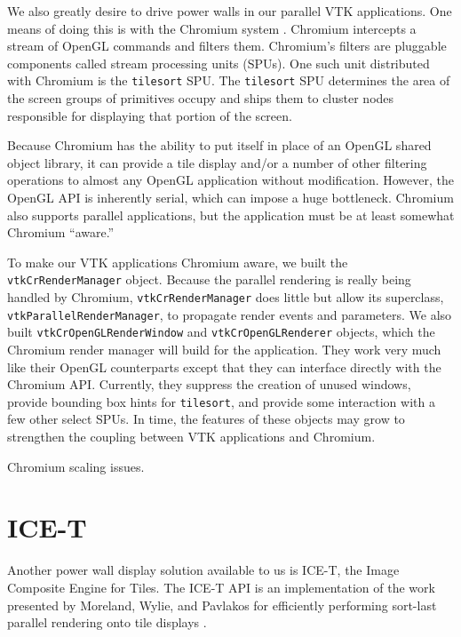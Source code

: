 \documentclass[twocolumn]{article}
\newcommand{\cidentifier}[1]{\texttt{#1}}
\begin{document}
  We also greatly desire to drive power walls in our parallel VTK
  applications.  One means of doing this is with the Chromium system
  \cite{Humphreys02}.  Chromium intercepts a stream of OpenGL commands and
  filters them.  Chromium's filters are pluggable components called stream
  processing units (SPUs).  One such unit distributed with Chromium is the
  \cidentifier{tile\-sort} SPU.  The \cidentifier{tile\-sort} SPU
  determines the area of the screen groups of primitives occupy and ships
  them to cluster nodes responsible for displaying that portion of the
  screen.

  Because Chromium has the ability to put itself in place of an OpenGL
  shared object library, it can provide a tile display and/or a number of
  other filtering operations to almost any OpenGL application without
  modification.  However, the OpenGL API is inherently serial, which can
  impose a huge bottleneck.  Chromium also supports parallel applications,
  but the application must be at least somewhat Chromium ``aware.''

  To make our VTK applications Chromium aware, we built the
  \cidentifier{vtk\-Cr\-Render\-Manager} object.  Because the parallel
  rendering is really being handled by Chromium,
  \cidentifier{vtk\-Cr\-Render\-Manager} does little but allow its
  superclass, \cidentifier{vtk\-Parallel\-Render\-Manager}, to propagate
  render events and parameters.  We also built
  \cidentifier{vtk\-Cr\-Open\-GL\-Render\-Window} and
  \cidentifier{vtk\-Cr\-Open\-GL\-Renderer} objects, which the Chromium
  render manager will build for the application.  They work very much like
  their OpenGL counterparts except that they can interface directly with
  the Chromium API.  Currently, they suppress the creation of unused
  windows, provide bounding box hints for \cidentifier{tile\-sort}, and
  provide some interaction with a few other select SPUs.  In time, the
  features of these objects may grow to strengthen the coupling between VTK
  applications and Chromium.

  Chromium scaling issues.


  \section{ICE-T}
  \label{sec:ICE-T}

  Another power wall display solution available to us is ICE-T, the Image
  Composite Engine for Tiles.  The ICE-T API is an implementation of the
  work presented by Moreland, Wylie, and Pavlakos for efficiently
  performing sort-last parallel rendering onto tile displays
  \cite{Moreland01}.
\end{document}
